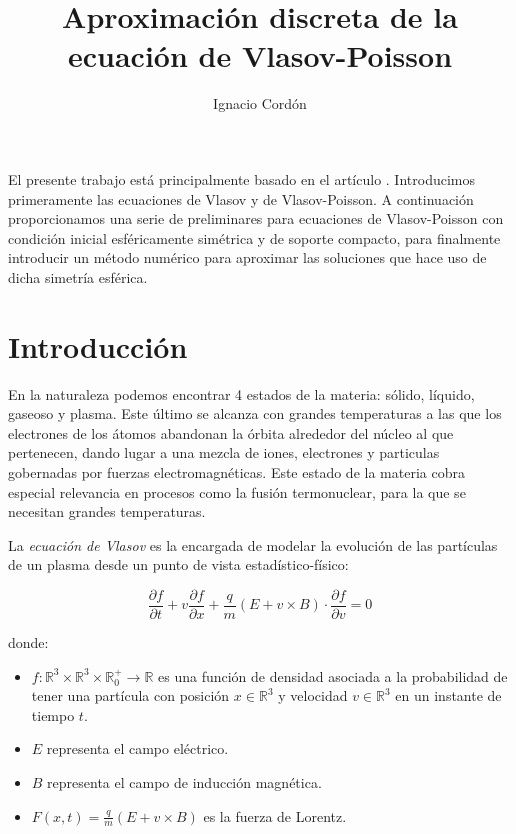 \documentclass[a4paper,10pt]{scrartcl}
\title{Aproximación discreta de la ecuación de Vlasov-Poisson}
\author{
	Ignacio Cordón
}
\date{}
\theoremstyle{definition}
\numberwithin{equation}{section}
\begin{document}
\maketitle
\begin{center}
\end{center}
\tableofcontents
\pagebreak

El presente trabajo está principalmente basado en el artículo \cite{Schaeffer}. Introducimos primeramente las ecuaciones de Vlasov y de Vlasov-Poisson. A continuación proporcionamos una serie de preliminares para ecuaciones de Vlasov-Poisson con condición inicial esféricamente simétrica y de soporte compacto, para finalmente introducir un método numérico para aproximar las soluciones que hace uso de dicha simetría esférica.

\section{Introducción}
En la naturaleza podemos encontrar 4 estados de la materia: sólido, líquido, gaseoso y plasma. Este último se alcanza con grandes temperaturas a las que los electrones de los átomos abandonan la órbita alrededor del núcleo al que pertenecen, dando lugar a una mezcla de iones, electrones y particulas gobernadas por fuerzas electromagnéticas. Este estado de la materia cobra especial relevancia en procesos como la fusión termonuclear, para la que se necesitan grandes temperaturas.  

La \textit{ecuación de Vlasov} es la encargada de modelar la evolución de las partículas de un plasma desde un punto de vista estadístico-físico:

\begin{equation}
 \frac{\partial f}{\partial t} + v \frac{\partial f}{\partial x} + \frac{q}{m} (E + v\times B) \cdot \frac{\partial f}{\partial v} = 0
\end{equation}

donde:

\begin{itemize}
 \item $f:\mathbb{R}^3 \times \mathbb{R}^3 \times \mathbb{R}^{+}_0 \rightarrow \mathbb{R}$ es una función de densidad asociada a la probabilidad de tener una partícula con posición $x \in \mathbb{R}^3$ y velocidad $v \in \mathbb{R}^3$ en un instante de tiempo $t$. 
 \item $E$ representa el campo eléctrico.
 \item $B$ representa el campo de inducción magnética.
 \item $F(x,t) = \frac{q}{m}(E + v\times B)$ es la fuerza de Lorentz.
\end{itemize}
\end{document}
